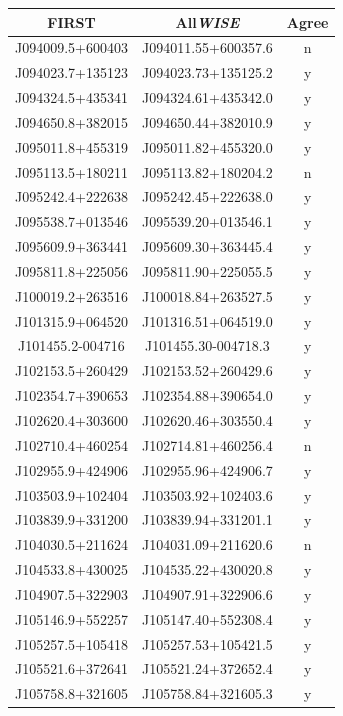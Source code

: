 \begin{table}
\begin{tabular}{ccc}
        \hline\hline
        FIRST & All\emph{WISE} & Agree\\\hline
        J094009.5+600403 & J094011.55+600357.6 & n\\
        J094023.7+135123 & J094023.73+135125.2 & y\\
        J094324.5+435341 & J094324.61+435342.0 & y\\
        J094650.8+382015 & J094650.44+382010.9 & y\\
        J095011.8+455319 & J095011.82+455320.0 & y\\
        J095113.5+180211 & J095113.82+180204.2 & n\\
        J095242.4+222638 & J095242.45+222638.0 & y\\
        J095538.7+013546 & J095539.20+013546.1 & y\\
        J095609.9+363441 & J095609.30+363445.4 & y\\
        J095811.8+225056 & J095811.90+225055.5 & y\\
        J100019.2+263516 & J100018.84+263527.5 & y\\
        J101315.9+064520 & J101316.51+064519.0 & y\\
        J101455.2-004716 & J101455.30-004718.3 & y\\
        J102153.5+260429 & J102153.52+260429.6 & y\\
        J102354.7+390653 & J102354.88+390654.0 & y\\
        J102620.4+303600 & J102620.46+303550.4 & y\\
        J102710.4+460254 & J102714.81+460256.4 & n\\
        J102955.9+424906 & J102955.96+424906.7 & y\\
        J103503.9+102404 & J103503.92+102403.6 & y\\
        J103839.9+331200 & J103839.94+331201.1 & y\\
        J104030.5+211624 & J104031.09+211620.6 & n\\
        J104533.8+430025 & J104535.22+430020.8 & y\\
        J104907.5+322903 & J104907.91+322906.6 & y\\
        J105146.9+552257 & J105147.40+552308.4 & y\\
        J105257.5+105418 & J105257.53+105421.5 & y\\
        J105521.6+372641 & J105521.24+372652.4 & y\\
        J105758.8+321605 & J105758.84+321605.3 & y\\

\end{tabular}
\end{table}
